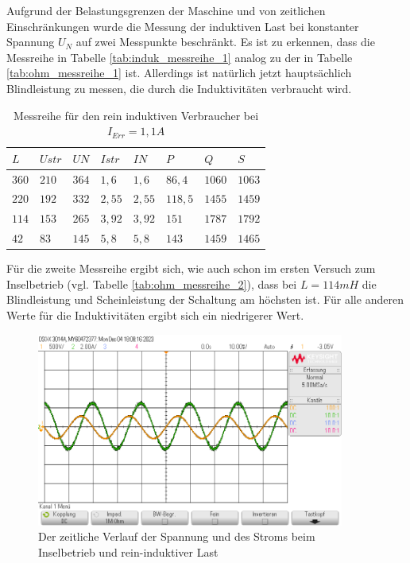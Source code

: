 \documentclass{report}
\begin{document}
Aufgrund der Belastungsgrenzen der Maschine und von zeitlichen Einschränkungen wurde die Messung der induktiven Last bei konstanter Spannung $U_{N}$ auf zwei Messpunkte beschränkt. Es ist zu erkennen, dass die Messreihe in Tabelle \ref{tab:induk_messreihe_1} analog zu der in Tabelle \ref{tab:ohm_messreihe_1} ist. Allerdings ist natürlich jetzt hauptsächlich Blindleistung zu messen, die durch die Induktivitäten verbraucht wird.


\begin{table}[!ht]
	\centering
	\begin{tabular}{llllllll}
		\hline
		$L$   & $Ustr$ & $UN$  & $Istr$ & $IN$   & $P$     & $Q$    & $S$    \\ \hline
		$360$ & $210$  & $364$ & $1,6$  & $1,6$  & $86,4$  & $1060$ & $1063$ \\
		$220$ & $192$  & $332$ & $2,55$ & $2,55$ & $118,5$ & $1455$ & $1459$ \\
		$114$ & $153$  & $265$ & $3,92$ & $3,92$ & $151$   & $1787$ & $1792$ \\
		$42$  & $83$   & $145$ & $5,8$  & $5,8$  & $143$   & $1459$ & $1465$ \\ \hline
	\end{tabular}
	\label{tab:induk_messreihe_2}
	\caption{Messreihe für den rein induktiven Verbraucher bei $I_{Err} = 1,1A$}
\end{table}

Für die zweite Messreihe ergibt sich, wie auch schon im ersten Versuch zum Inselbetrieb (vgl. Tabelle \ref{tab:ohm_messreihe_2}), dass bei $L=114mH$ die Blindleistung und Scheinleistung der Schaltung am höchsten ist. Für alle anderen Werte für die Induktivitäten ergibt sich ein niedrigerer Wert.

\begin{figure}[!ht]
	\centering
	\includegraphics[width=0.9\textwidth]{./assets/img/Inselbetrieb360mHIE1.1.png}
	\caption{Der zeitliche Verlauf der Spannung und des Stroms beim Inselbetrieb und rein-induktiver Last}
	\label{fig:insel_reininduk_oszi}
\end{figure}
\end{document}
